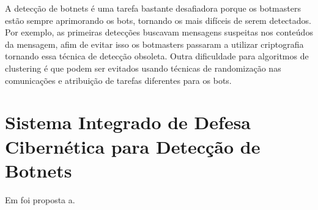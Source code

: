 A detecção de botnets é uma tarefa bastante desafiadora porque os botmasters estão sempre aprimorando os bots, tornando os mais difíceis de serem detectados. Por exemplo, as primeiras detecções buscavam mensagens suspeitas nos conteúdos da mensagem, afim de evitar isso os botmasters passaram a utilizar criptografia tornando essa técnica de detecção obsoleta. Outra dificuldade para algoritmos de clustering é que podem ser evitados usando técnicas de randomização nas comunicações e atribuição de tarefas diferentes para os bots.

\section{Sistema Integrado de Defesa Cibernética para Detecção de Botnets}
Em \cite{silva2012arquitetura} foi proposta a.
